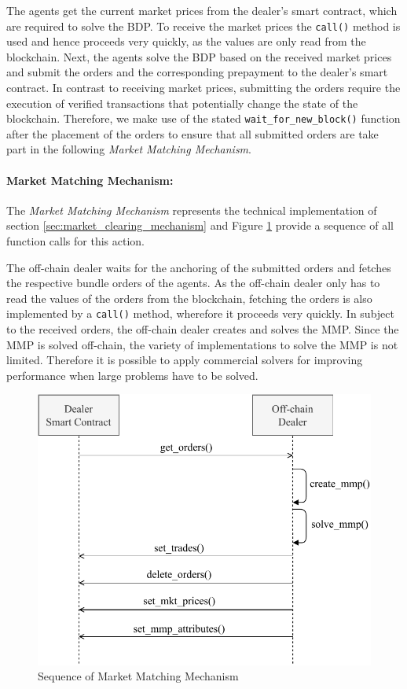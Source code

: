 The agents get the current market prices from the dealer's smart contract, which are required to solve 
the BDP.
To receive the market prices the \verb|call()| method is used and hence proceeds very quickly,
as the values are only read from the blockchain.
Next, the agents solve the BDP based on the received market prices and submit 
the orders and the corresponding prepayment to the dealer's smart contract. In contrast to receiving market prices, 
submitting the orders require the execution of verified transactions that potentially
change the state of the blockchain. Therefore, we make use of the stated 
\verb|wait_for_new_block()| function after the placement of the orders to ensure 
that all submitted orders are take part in the following \textit{Market Matching Mechanism}.


\paragraph{Market Matching Mechanism:}
The \textit{Market Matching Mechanism} represents the technical implementation of section 
\ref{sec:market_clearing_mechanism} and Figure \ref{figure:dealers_mmp} provide 
a sequence of all function calls for this action.

The off-chain dealer waits for the anchoring of the submitted orders and fetches the 
respective bundle orders of the agents. 
As the off-chain dealer only has to read the values of the orders from the blockchain,
fetching the orders is also implemented by a \verb|call()| method, wherefore it proceeds very quickly.
In subject to the received orders, the off-chain dealer creates and solves the MMP.
Since the MMP is solved off-chain, the variety of implementations to solve the MMP is 
not limited. Therefore it is possible to apply commercial solvers for improving 
performance when large problems have to be solved.

\begin{figure}[htbp]
	\centering
	\includegraphics[width=.8\linewidth]{./figures/dealers_mmp.pdf}
	\caption{Sequence of Market Matching Mechanism}
	\label{figure:dealers_mmp}
\end{figure}

